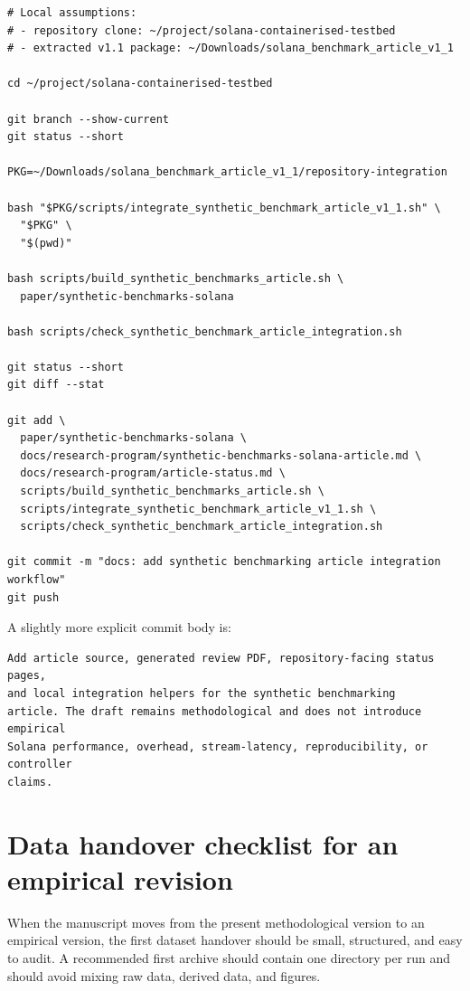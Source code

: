 \documentclass[11pt,a4paper]{article}
\begin{document}
\begin{verbatim}
# Local assumptions:
# - repository clone: ~/project/solana-containerised-testbed
# - extracted v1.1 package: ~/Downloads/solana_benchmark_article_v1_1

cd ~/project/solana-containerised-testbed

git branch --show-current
git status --short

PKG=~/Downloads/solana_benchmark_article_v1_1/repository-integration

bash "$PKG/scripts/integrate_synthetic_benchmark_article_v1_1.sh" \
  "$PKG" \
  "$(pwd)"

bash scripts/build_synthetic_benchmarks_article.sh \
  paper/synthetic-benchmarks-solana

bash scripts/check_synthetic_benchmark_article_integration.sh

git status --short
git diff --stat

git add \
  paper/synthetic-benchmarks-solana \
  docs/research-program/synthetic-benchmarks-solana-article.md \
  docs/research-program/article-status.md \
  scripts/build_synthetic_benchmarks_article.sh \
  scripts/integrate_synthetic_benchmark_article_v1_1.sh \
  scripts/check_synthetic_benchmark_article_integration.sh

git commit -m "docs: add synthetic benchmarking article integration workflow"
git push
\end{verbatim}

A slightly more explicit commit body is:

\begin{verbatim}
Add article source, generated review PDF, repository-facing status pages,
and local integration helpers for the synthetic benchmarking
article. The draft remains methodological and does not introduce empirical
Solana performance, overhead, stream-latency, reproducibility, or controller
claims.
\end{verbatim}

\section{Data handover checklist for an empirical revision}
\label{app:data-handover}

When the manuscript moves from the present methodological version to an empirical version, the first dataset handover should be small, structured, and easy to audit. A recommended first archive should contain one directory per run and should avoid mixing raw data, derived data, and figures.
\end{document}
